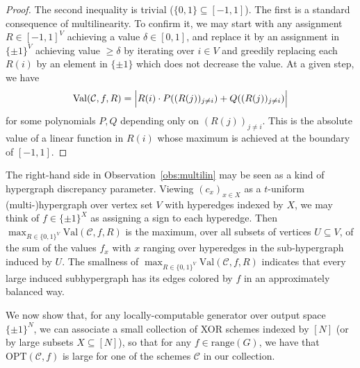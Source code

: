 \documentclass[11pt]{article}
\newcommand{\B}{\{0,1\}}
\newcommand{\rng}{\mathrm{range}}
\newcommand{\Val}{\mathrm{Val}}
\newcommand{\Opt}{\mathrm{OPT}}
\begin{document}
\begin{proof}
The second inequality is trivial ($\B \subseteq [-1,1]$). The first is a standard consequence of multilinearity. To confirm it, we may start with any assignment $R \in [-1,1]^V$ achieving a value $\delta \in [0,1]$, and replace it by an assignment in $\{\pm 1\}^V$ achieving value $\geq \delta$ by iterating over $i\in V$ and greedily replacing each $R(i)$ by an element in $\{\pm 1\}$ which does not decrease the value. At a given step, we have 
\[
\Val(\mathcal{C},f,R)= \Bigl|R(i) \cdot P((R(j))_{j \neq i}) +  Q((R(j))_{j \neq i})\Bigr|
\]
for some polynomials $P,Q$ depending only on $(R(j))_{j \neq i}$. This is the absolute value of a linear function in $R(i)$ whose maximum is achieved at the boundary of $[-1,1]$.
\end{proof}
The right-hand side in Observation~\ref{obs:multilin} may be seen as a kind of hypergraph discrepancy parameter. Viewing $(c_x)_{x \in X}$ as a $t$-uniform (multi-)hypergraph over vertex set $V$ with hyperedges indexed by $X$, we may think of $f \in \{ \pm 1\}^X$ as assigning a sign to each hyperedge. Then $ \max_{R\in \{0,1\}^V} \mathrm{Val} (\mathcal{C},f,R) $ is the maximum, over all subsets of vertices $U \subseteq V$, of the sum of the values $f_x$ with $x$ ranging over hyperedges in the sub-hypergraph induced by $U$. The smallness of $ \max_{R\in \{0,1\}^V} \mathrm{Val} (\mathcal{C},f,R) $ indicates that every large induced subhypergraph has its edges colored by $f$ in an approximately balanced way.

We now show that, for any locally-computable generator over output space $\{\pm 1\}^N$, we can associate a small collection of XOR schemes indexed by $[N]$ (or by large subsets $X\subseteq [N]$), so that for any $f \in \rng(G)$, we have that $\Opt(\mathcal{C},f)$ is large for one of the schemes $\mathcal{C}$ in our collection. 
\end{document}
